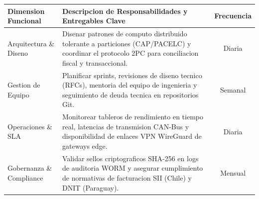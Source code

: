 \documentclass[11pt,a4paper]{article}
\begin{document}
\clearpage


\drawchromaticbar[3.5pt]
\vspace{2.5mm}

\vspace{1mm}

\noindent
\begin{tabularx}{\linewidth}{@{} p{3.2cm} X c @{}}
  \toprule
  \rowcolor{corpPrimary}
  {\bfseries\color{white}\scriptsize Dimension Funcional} &
  {\bfseries\color{white}\scriptsize Descripcion de Responsabilidades y Entregables Clave} &
  {\bfseries\color{white}\scriptsize Frecuencia} \\
  \midrule
  \rowcolor{corpLightBg}
  Arquitectura \& Diseno & Disenar patrones de computo distribuido tolerante a particiones (CAP/PACELC) y coordinar el protocolo 2PC para conciliacion fiscal y transaccional. & Diaria \\
  Gestion de Equipo & Planificar sprints, revisiones de diseno tecnico (RFCs), mentoria del equipo de ingenieria y seguimiento de deuda tecnica en repositorios Git. & Semanal \\
  \rowcolor{corpLightBg}
  Operaciones \& SLA & Monitorear tableros de rendimiento en tiempo real, latencias de transmision CAN-Bus y disponibilidad de enlaces VPN WireGuard de gateways edge. & Diaria \\
  Gobernanza \& Compliance & Validar sellos criptograficos SHA-256 en logs de auditoria WORM y asegurar cumplimiento de normativas de facturacion SII (Chile) y DNIT (Paraguay). & Mensual \\
  \bottomrule
\end{tabularx}

\vspace{2.5mm}

\vspace{1mm}
\end{document}
